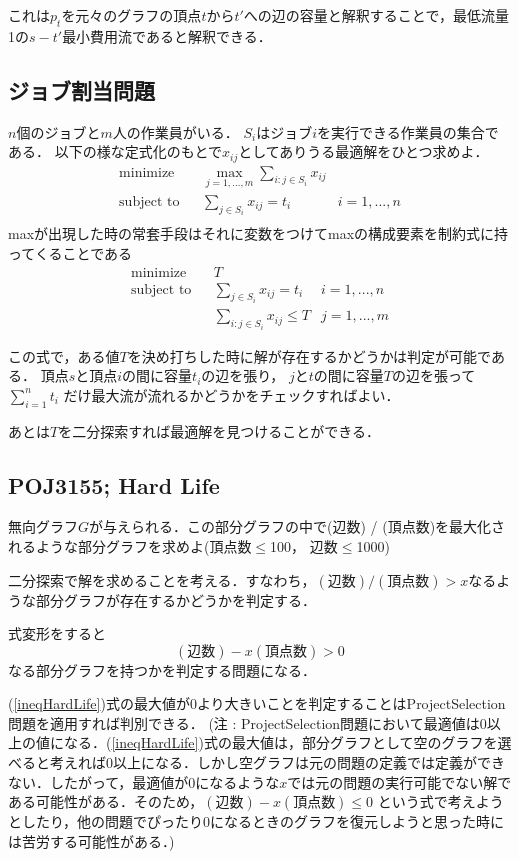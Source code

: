 \documentclass[13pt, a4paper, landscape]{jarticle}
\theoremstyle{nonitalic} %
\begin{document}
これは$p_t$を元々のグラフの頂点$t$から$t'$への辺の容量と解釈することで，最低流量1の$s-t'$最小費用流であると解釈できる．

\subsection{ジョブ割当問題}
$n$個のジョブと$m$人の作業員がいる．
$S_i$はジョブ$i$を実行できる作業員の集合である．
以下の様な定式化のもとで$x_{ij}$としてありうる最適解をひとつ求めよ．
\begin{align}
  &&&&& \textrm{minimize}   && \max_{j=1,...,m} \sum_{i:j \in S_i} x_{ij} \\
  &&&&& \textrm{subject to} && \sum_{j \in S_i} x_{ij} = t_i  & i=1,...,n &&&&&\\
\end{align}
maxが出現した時の常套手段はそれに変数をつけてmaxの構成要素を制約式に持ってくることである
\begin{align}
  &&&&& \textrm{minimize}   && T \\
  &&&&& \textrm{subject to} && \sum_{j \in S_i} x_{ij} = t_i  & i=1,...,n &&&&&\\
  &&&&&                     &&  \sum_{i:j \in S_i} x_{ij} \leq T & j=1,...,m
\end{align}

この式で，ある値$T$を決め打ちした時に解が存在するかどうかは判定が可能である． 頂点$s$と頂点$i$の間に容量$t_i$の辺を張り， $j$と$t$の間に容量$T$の辺を張って$\sum_{i=1}^n t_i $ だけ最大流が流れるかどうかをチェックすればよい．

あとは$T$を二分探索すれば最適解を見つけることができる．


\subsection{POJ3155; Hard Life}
無向グラフ$G$が与えられる．この部分グラフの中で(辺数) / (頂点数)を最大化されるような部分グラフを求めよ(頂点数$\leq$100， 辺数$\leq$1000)

二分探索で解を求めることを考える．すなわち，$ (\textrm{辺数}) / (\textrm{頂点数})  > x$なるような部分グラフが存在するかどうかを判定する．

式変形をすると
\begin{equation}
  (\textrm{辺数}) - x (\textrm{頂点数}) > 0 \label{ineqHardLife}
\end{equation}
なる部分グラフを持つかを判定する問題になる．

(\ref{ineqHardLife})式の最大値が0より大きいことを判定することはProjectSelection問題を適用すれば判別できる． (注 : ProjectSelection問題において最適値は0以上の値になる．(\ref{ineqHardLife})式の最大値は，部分グラフとして空のグラフを選べると考えれば0以上になる．しかし空グラフは元の問題の定義では定義ができない．したがって，最適値が0になるような$x$では元の問題の実行可能でない解である可能性がある．そのため，$ (\textrm{辺数}) - x (\textrm{頂点数}) \leq 0 $  という式で考えようとしたり，他の問題でぴったり$0$になるときのグラフを復元しようと思った時には苦労する可能性がある．)
\end{document}
